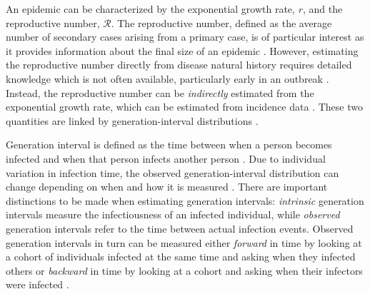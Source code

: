 \documentclass[12pt]{article}
\newcommand{\RR}{\ensuremath{{\mathcal R}}}
\begin{document}
An epidemic can be characterized by the exponential growth rate, $r$, and the reproductive number, \RR.
The reproductive number, defined as the average number of secondary cases arising from a primary case, is of particular interest as it provides information about the final size of an epidemic \citep{anderson1991infectious, diekmann1990definition}.
However, estimating the reproductive number directly from disease natural history requires detailed knowledge which is not often available, particularly early in an outbreak \citep{dietz1993estimation}.
Instead, the reproductive number can be \emph{indirectly} estimated from the exponential growth rate, which can be estimated from incidence data \citep{chowell2003sars, mills2004transmissibility, nishiura2009transmission, nishiura2010pros, ma2014estimating}.
These two quantities are linked by generation-interval distributions \citep{wearing2005appropriate, svensson2007note, roberts2007model, wallinga2007generation, park2019practical}.

Generation interval is defined as the time between when a person becomes infected and when that person infects another person \citep{svensson2007note}.
Due to individual variation in infection time, the observed generation-interval distribution can change depending on when and how it is measured \citep{svensson2007note, kenah2008generation, nishiura2010time, champredon2015intrinsic}.
There are important distinctions to be made when estimating generation intervals: \emph{intrinsic} generation intervals measure the infectiousness of an infected individual,
while \emph{observed} generation intervals refer to the time between actual infection events.
Observed generation intervals in turn can be measured either \emph{forward} in time by looking at a cohort of individuals infected at the same time and asking when they infected others or \emph{backward} in time by looking at a cohort and asking when their infectors were infected \citep{champredon2015intrinsic}.
\end{document}

